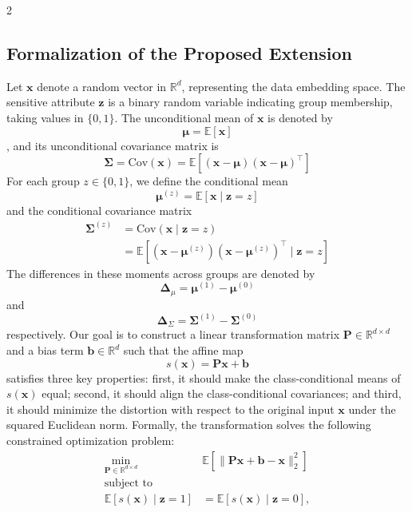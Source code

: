 \documentclass[ecta,nameyear,final]{econsocart}
\numberwithin{equation}{section}
\theoremstyle{plain}
\theoremstyle{definition}
\begin{document}
\begin{multicols}{2}
\subsection{Formalization of the Proposed Extension}
Let $\mathbf{x}$ denote a random vector in $\mathbb{R}^d$, representing the data embedding space. The sensitive attribute $\mathbf{z}$ is a binary random variable indicating group membership, taking values in $\{0,1\}$. The unconditional mean of $\mathbf{x}$ is denoted by 
$$\boldsymbol{\mu} = \mathbb{E}[\mathbf{x}]$$, and its unconditional covariance matrix is 
$$\boldsymbol{\Sigma} = \text{Cov}(\mathbf{x}) = \mathbb{E}[(\mathbf{x} - \boldsymbol{\mu})(\mathbf{x} - \boldsymbol{\mu})^\top]$$
For each group $z \in \{0,1\}$, we define the conditional mean 
$$\boldsymbol{\mu}^{(z)} = \mathbb{E}[\mathbf{x} \mid \mathbf{z}=z]$$ and the conditional covariance matrix
\begin{align*}
    \boldsymbol{\Sigma}^{(z)} &= \text{Cov}(\mathbf{x} \mid \mathbf{z}=z) \\ &= \mathbb{E}[(\mathbf{x} - \boldsymbol{\mu}^{(z)})(\mathbf{x} - \boldsymbol{\mu}^{(z)})^\top \mid \mathbf{z}=z]
\end{align*} 
The differences in these moments across groups are denoted by $$\boldsymbol{\Delta}_{\mu} = \boldsymbol{\mu}^{(1)} - \boldsymbol{\mu}^{(0)}$$ and $$\boldsymbol{\Delta}_{\Sigma} = \boldsymbol{\Sigma}^{(1)} - \boldsymbol{\Sigma}^{(0)}$$ respectively.
\newline \newline
Our goal is to construct a linear transformation matrix $\mathbf{P} \in \mathbb{R}^{d \times d}$ and a bias term $\mathbf{b} \in \mathbb{R}^d$ such that the affine map 
$$s(\mathbf{x}) = \mathbf{P}\mathbf{x} + \mathbf{b}$$ satisfies three key properties: first, it should make the class-conditional means of $s(\mathbf{x})$ equal; second, it should align the class-conditional covariances; and third, it should minimize the distortion with respect to the original input $\mathbf{x}$ under the squared Euclidean norm.
\newline \newline
Formally, the transformation solves the following constrained optimization problem:
\begin{align*}
    \min_{\mathbf{P} \in \mathbb{R}^{d \times d}} \ &\mathbb{E} \left[ \| \mathbf{P}\mathbf{x} + \mathbf{b} - \mathbf{x} \|_2^2 \right] \\
    \text{subject to} \\ \mathbb{E}[s(\mathbf{x}) \mid \mathbf{z}=1] &= \mathbb{E}[s(\mathbf{x}) \mid \mathbf{z}=0], \\

\end{align*}
\end{multicols}
\end{document}
